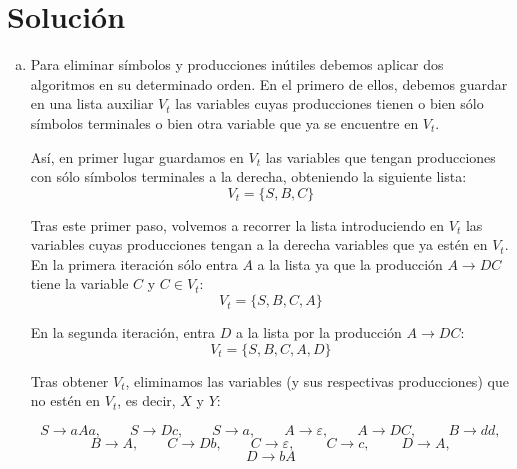 \documentclass[10pt,a4paper,spanish]{report}
\begin{document}
\section{\textcolor{p9}Solución}
\begin{enumerate}[a)]
  \item Para eliminar símbolos y producciones inútiles debemos aplicar dos algoritmos en su determinado orden. En el primero de ellos, debemos guardar en una lista auxiliar $V_t$ las variables cuyas producciones tienen o bien sólo símbolos terminales o bien otra variable que ya se encuentre en $V_t$.

  Así, en primer lugar guardamos en $V_t$ las variables que tengan producciones con sólo símbolos terminales a la derecha, obteniendo la siguiente lista:
  \begin{displaymath}
    V_t = \{S,B,C\}
  \end{displaymath}

  Tras este primer paso, volvemos a recorrer la lista introduciendo en $V_t$ las variables cuyas producciones tengan a la derecha variables que ya estén en $V_t$. En la primera iteración sólo entra $A$ a la lista ya que la producción $A \rightarrow DC$ tiene la variable $C$ y $C\in V_t$:
  \begin{displaymath}
    V_t = \{S,B,C,A\}
  \end{displaymath}

  En la segunda iteración, entra $D$ a la lista por la producción $A\rightarrow DC$:
  \begin{displaymath}
    V_t = \{S,B,C,A,D\}
  \end{displaymath}

  Tras obtener $V_t$, eliminamos las variables (y sus respectivas producciones) que no estén en $V_t$, es decir, $X$ y $Y$:

  \begin{displaymath}
    S \rightarrow aAa, \qquad S \rightarrow Dc, \qquad S \rightarrow a, \qquad A \rightarrow \varepsilon, \qquad A \rightarrow DC, \qquad\  B \rightarrow dd,
\end{displaymath}
\begin{displaymath}
    B \rightarrow A, \qquad C \rightarrow Db, \qquad C \rightarrow \varepsilon, \qquad\ C \rightarrow c, \qquad\ D \rightarrow A, 
\end{displaymath}
\begin{displaymath}
    D \rightarrow bA
\end{displaymath}


\end{enumerate}
\end{document}
